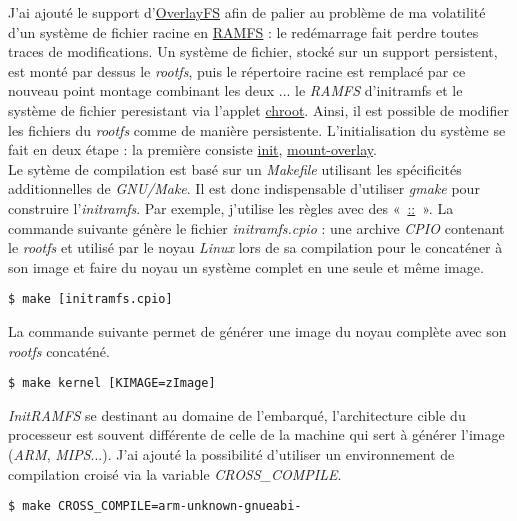 \documentclass[a4paper]{article}
\begin{document}
J'ai ajouté le support d'\href{https://www.kernel.org/doc/Documentation/filesystems/overlayfs.txt}{OverlayFS} afin de palier au problème de ma volatilité d'un système de fichier racine en \href{https://fr.wikipedia.org/wiki/Ramfs}{RAMFS} : le redémarrage fait perdre toutes traces de modifications. Un système de fichier, stocké sur un support persistent, est monté par dessus le \textit{rootfs}, puis le répertoire racine est remplacé par ce nouveau point montage combinant les deux ... le \textit{RAMFS} d'initramfs et le système de fichier peresistant via l'applet \href{http://www.busybox.net/downloads/BusyBox.html##chroot}{chroot}. Ainsi, il est possible de modifier les fichiers du \textit{rootfs} comme de manière persistente. L'initialisation du système se fait en deux étape : la première consiste
\href{https://github.com/gazoo74/initramfs/blob/master/packages-initramfs/overlay/init}{init}, \href{https://github.com/gazoo74/initramfs/blob/master/packages-initramfs/overlay/etc/init.d/mount-overlay}{mount-overlay}.\\

Le sytème de compilation est basé sur un \textit{Makefile} utilisant les spécificités additionnelles de \textit{GNU/Make}. Il est donc indispensable d'utiliser \textit{gmake} pour construire l'\textit{initramfs}. Par exemple, j'utilise les règles avec des «~\href{https://www.gnu.org/software/make/manual/html_node/Double_002dColon.html}{::}~».
La commande suivante génère le fichier \textit{initramfs.cpio} : une archive \textit{CPIO} contenant le \textit{rootfs} et utilisé par le noyau \textit{Linux} lors de sa compilation pour le concaténer à son image et faire du noyau un système complet en une seule et même image.
\begin{verbatim}
$ make [initramfs.cpio]
\end{verbatim}
La commande suivante permet de générer une image du noyau complète avec son \textit{rootfs} concaténé.
\begin{verbatim}
$ make kernel [KIMAGE=zImage]
\end{verbatim}

\textit{InitRAMFS} se destinant au domaine de l'embarqué, l'architecture cible du processeur est souvent différente de celle de la machine qui sert à générer l'image (\textit{ARM}, \textit{MIPS}...). J'ai ajouté la possibilité d'utiliser un environnement de compilation croisé via la variable \textit{CROSS\_COMPILE}.
\begin{verbatim}
$ make CROSS_COMPILE=arm-unknown-gnueabi-
\end{verbatim}
\end{document}
